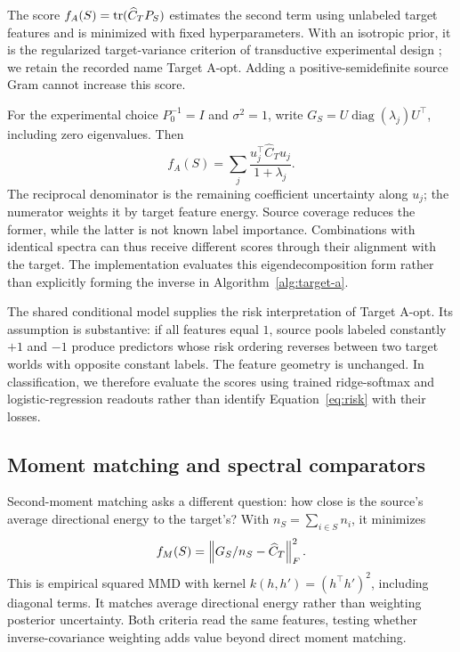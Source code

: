 The score $f_A(S)=\operatorname{tr}(\widehat C_TP_S)$ estimates the second term using unlabeled target features and is minimized with fixed hyperparameters. With an isotropic prior, it is the regularized target-variance criterion of transductive experimental design \citep{yu2006,hubotter2024transductive}; we retain the recorded name Target A-opt. Adding a positive-semidefinite source Gram cannot increase this score.

For the experimental choice $P_0^{-1}=I$ and $\sigma^2=1$, write $G_S=U\operatorname{diag}(\lambda_j)U^\top$, including zero eigenvalues. Then
\begin{equation}
 f_A(S)=\sum_j\frac{u_j^\top\widehat C_Tu_j}{1+\lambda_j}.
 \label{eq:target-directions}
\end{equation}
The reciprocal denominator is the remaining coefficient uncertainty along $u_j$; the numerator weights it by target feature energy. Source coverage reduces the former, while the latter is not known label importance. Combinations with identical spectra can thus receive different scores through their alignment with the target. The implementation evaluates this eigendecomposition form rather than explicitly forming the inverse in Algorithm~\ref{alg:target-a}.

The shared conditional model supplies the risk interpretation of Target A-opt. Its assumption is substantive: if all features equal $1$, source pools labeled constantly $+1$ and $-1$ produce predictors whose risk ordering reverses between two target worlds with opposite constant labels. The feature geometry is unchanged. In classification, we therefore evaluate the scores using trained ridge-softmax and logistic-regression readouts rather than identify Equation~\eqref{eq:risk} with their losses.

\subsection{Moment matching and spectral comparators}
Second-moment matching asks a different question: how close is the source's average directional energy to the target's? With $n_S=\sum_{i\in S}n_i$, it minimizes
\begin{equation}
 f_M(S)=\left\lVert G_S/n_S-\widehat C_T\right\rVert_F^2.
 \label{eq:mmd}
\end{equation}
This is empirical squared MMD with kernel $k(h,h')=(h^\top h')^2$, including diagonal terms. It matches average directional energy rather than weighting posterior uncertainty. Both criteria read the same features, testing whether inverse-covariance weighting adds value beyond direct moment matching.

